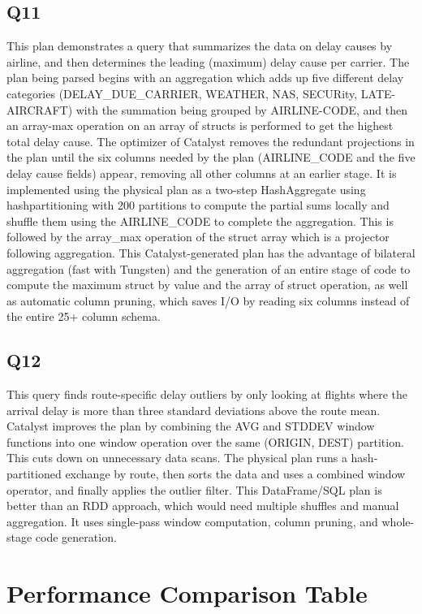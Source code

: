 \documentclass{article}
\begin{document}
\subsection{Q11}
This plan demonstrates a query that summarizes the data on delay causes by airline, and then determines the leading (maximum) delay cause per carrier. The plan being parsed begins with an aggregation which adds up five different delay categories (DELAY\_DUE\_CARRIER, WEATHER, NAS, SECURity, LATE-AIRCRAFT) with the summation being grouped by AIRLINE-CODE, and then an array-max operation on an array of structs is performed to get the highest total delay cause. The optimizer of Catalyst removes the redundant projections in the plan until the six columns needed by the plan (AIRLINE\_CODE and the five delay cause fields) appear, removing all other columns at an earlier stage. It is implemented using the physical plan as a two-step HashAggregate using hashpartitioning with 200 partitions to compute the partial sums locally and shuffle them using the AIRLINE\_CODE to complete the aggregation. This is followed by the array\_max operation of the struct array which is a projector following aggregation. This Catalyst-generated plan has the advantage of bilateral aggregation (fast with Tungsten) and the generation of an entire stage of code to compute the maximum struct by value and the array of struct operation, as well as automatic column pruning, which saves I/O by reading six columns instead of the entire 25+ column schema.
\subsection{Q12}
This query finds route-specific delay outliers by only looking at flights where the arrival delay is more than three standard deviations above the route mean. Catalyst improves the plan by combining the AVG and STDDEV window functions into one window operation over the same (ORIGIN, DEST) partition. This cuts down on unnecessary data scans. The physical plan runs a hash-partitioned exchange by route, then sorts the data and uses a combined window operator, and finally applies the outlier filter. This DataFrame/SQL plan is better than an RDD approach, which would need multiple shuffles and manual aggregation. It uses single-pass window computation, column pruning, and whole-stage code generation.
\section{Performance Comparison Table}
\end{document}
